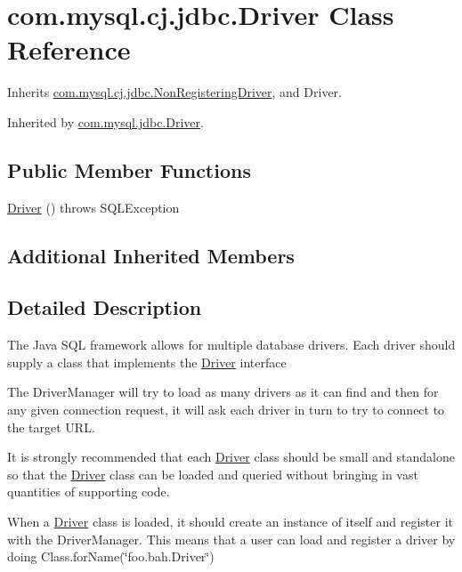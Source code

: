 \hypertarget{classcom_1_1mysql_1_1cj_1_1jdbc_1_1_driver}{}\section{com.\+mysql.\+cj.\+jdbc.\+Driver Class Reference}
\label{classcom_1_1mysql_1_1cj_1_1jdbc_1_1_driver}


Inherits \mbox{\hyperlink{classcom_1_1mysql_1_1cj_1_1jdbc_1_1_non_registering_driver}{com.\+mysql.\+cj.\+jdbc.\+Non\+Registering\+Driver}}, and Driver.



Inherited by \mbox{\hyperlink{classcom_1_1mysql_1_1jdbc_1_1_driver}{com.\+mysql.\+jdbc.\+Driver}}.

\subsection*{Public Member Functions}
\begin{DoxyCompactItemize}
\item 
\mbox{\hyperlink{classcom_1_1mysql_1_1cj_1_1jdbc_1_1_driver_aa4ef6be75ad3caf8eb7ebd1cfe77ddfe}{Driver}} ()  throws S\+Q\+L\+Exception 
\end{DoxyCompactItemize}
\subsection*{Additional Inherited Members}


\subsection{Detailed Description}
The Java S\+QL framework allows for multiple database drivers. Each driver should supply a class that implements the \mbox{\hyperlink{classcom_1_1mysql_1_1cj_1_1jdbc_1_1_driver}{Driver}} interface

The Driver\+Manager will try to load as many drivers as it can find and then for any given connection request, it will ask each driver in turn to try to connect to the target U\+RL.

It is strongly recommended that each \mbox{\hyperlink{classcom_1_1mysql_1_1cj_1_1jdbc_1_1_driver}{Driver}} class should be small and standalone so that the \mbox{\hyperlink{classcom_1_1mysql_1_1cj_1_1jdbc_1_1_driver}{Driver}} class can be loaded and queried without bringing in vast quantities of supporting code.

When a \mbox{\hyperlink{classcom_1_1mysql_1_1cj_1_1jdbc_1_1_driver}{Driver}} class is loaded, it should create an instance of itself and register it with the Driver\+Manager. This means that a user can load and register a driver by doing Class.\+for\+Name(\char`\"{}foo.\+bah.\+Driver\char`\"{}) 

